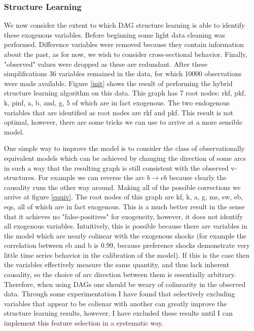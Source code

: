 \documentclass{article}
\begin{document}
\subsubsection{Structure Learning}

We now consider the extent to which DAG structure learning is able to identify these exogenous variables. Before beginning some light data cleaning was performed. Difference variables were removed because they contain information about the past, as for now, we wish to consider cross-sectional behavior. Finally, "observed" values were dropped as these are redundant. After these simplifications 36 variables remained in the data, for which 10000 observations were made available. Figure \ref{init} shows the result of performing the hybrid structure learning algorithm on this data. This graph has 7 root nodes: rkf, pkf, k, pinf, a, b, and, g, 5 of which are in fact exogenous. The two endogenous variables that are identified as root nodes are rkf and pkf. This result is not optimal, however, there are some tricks we can use to arrive at a more sensible model.

One simple way to improve the model is to consider the class of observationally equivalent models which can be achieved by changing the direction of some arcs in such a way that the resulting graph is still consistent with the observed v-structures. For example we can reverse the arc $b \rightarrow eb$ because clearly the causality runs the other way around. Making all of the possible corrections we arrive at figure \ref{equiv}. The root nodes of this graph are kf, k, a, g, ms, sw, eb, eqs, all of which are in fact exogenous. This is a much better result in the sense that it achieves no "false-positives" for exogeneity, however, it does not identify all exogenous variables. Intuitively, this is possible because there are variables in the model which are nearly colinear with the exogenous shocks (for example the correlation between eb and b is 0.99, because preference shocks demonstrate very little time series behavior in the calibration of the model). If this is the case then the variables effectively measure the same quantity, and thus lack inherent causality, so the choice of arc direction between them is essentially arbitrary. Therefore, when using DAGs one should be weary of colinearity in the observed data. Through some experimentation I have found that selectively excluding variables that appear to be colienar with another can greatly improve the structure learning results, however, I have excluded these results until I can implement this feature selection in a systematic way.
\end{document}

